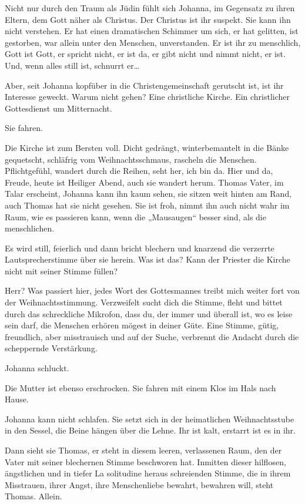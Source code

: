 \documentclass[10pt,titlepage,a5paper]{book}
\begin{document}
Nicht nur durch den Traum als Jüdin fühlt sich Johanna, im Gegensatz zu ihren Eltern, dem Gott näher als Christus. Der Christus ist ihr suspekt. Sie kann ihn nicht verstehen. Er hat einen dramatischen Schimmer um sich, er hat gelitten, ist gestorben, war allein unter den Menschen, unverstanden. Er ist ihr zu menschlich, Gott ist Gott, er spricht nicht, er ist da, er gibt nicht und nimmt nicht, er ist. Und, wenn alles still ist, schnurrt er\dots 

Aber, seit Johanna kopfüber in die Christengemeinschaft gerutscht ist, ist ihr Interesse geweckt. Warum nicht gehen? Eine christliche Kirche. Ein christlicher Gottesdienst um Mitternacht.

Sie fahren.

Die Kirche ist zum Bersten voll. Dicht gedrängt, winterbemantelt in die Bänke gequetscht, schläfrig vom Weihnachtsschmaus, rascheln die Menschen. Pflichtgefühl, wandert durch die Reihen, seht her, ich bin da. Hier und da, Freude, heute ist Heiliger Abend, auch sie wandert herum.
Thomas Vater, im Talar  erscheint, Johanna kann ihn kaum sehen, sie sitzen weit hinten am Rand, auch Thomas hat sie nicht gesehen. Sie ist froh, nimmt ihn auch nicht wahr im Raum, wie es passieren kann, wenn die „Mausaugen“ besser sind, als die menschlichen.

Es wird still, feierlich und dann bricht blechern und knarzend die verzerrte Lautsprecherstimme über sie herein. Was ist das? Kann der Priester die Kirche nicht mit seiner Stimme füllen? 

Herr? Was passiert hier, jedes Wort des Gottesmannes treibt mich weiter fort von der Weihnachtsstimmung. Verzweifelt sucht dich die Stimme, fleht und bittet durch das schreckliche Mikrofon, dass du, der immer und überall  ist, wo es leise sein darf, die Menschen erhören mögest in deiner Güte. Eine Stimme, gütig, freundlich, aber misstrauisch und auf der Suche, verbrennt die Andacht durch die scheppernde Verstärkung.

Johanna schluckt. 

Die Mutter ist ebenso erschrocken. Sie fahren mit einem Klos im Hals nach Hause.

Johanna kann nicht schlafen. Sie setzt sich in der heimatlichen Weihnachtsstube in den Sessel, die Beine hängen über die Lehne. Ihr ist kalt, erstarrt ist es in ihr. 

Dann sieht sie Thomas, er steht in diesem leeren, verlassenen Raum, den der Vater mit seiner blechernen Stimme beschworen hat. Inmitten dieser hilflosen,  ängstlichen und in tiefer La solitudine heraus schreienden Stimme, die in ihrem Misstrauen, ihrer Angst, ihre Menschenliebe bewahrt, bewahren will, steht Thomas. Allein. 
\end{document}
